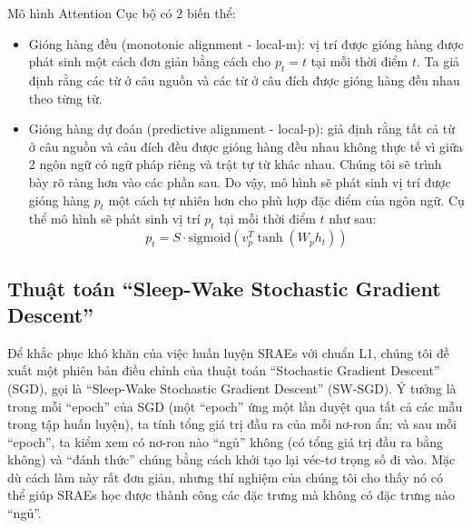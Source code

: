 Mô hình Attention Cục bộ có 2 biến thể:
\begin{itemize}
	\item Gióng hàng đều (monotonic alignment - local-m): vị trí được gióng hàng được phát sinh một cách đơn giản bằng cách cho $p_t = t$ tại mỗi thời điểm $t$. Ta giả định rằng các từ ở câu nguồn và các từ ở câu đích được gióng hàng đều nhau theo từng từ.
	\item Gióng hàng dự đoán (predictive alignment - local-p): giả định rằng tất cả từ ở câu nguồn và câu đích đều được gióng hàng đều nhau không thực tế vì giữa 2 ngôn ngữ có ngữ pháp riêng và trật tự từ khác nhau. Chúng tôi sẽ trình bày rõ ràng hơn vào các phần sau. Do vậy, mô hình sẽ phát sinh vị trí được gióng hàng $p_t$ một cách tự nhiên hơn cho phù hợp đặc điểm của ngôn ngữ. Cụ thể mô hình sẽ phát sinh vị trí $p_t$ tại mỗi thời điểm $t$ như sau:
	\begin{equation}
	p_t = S \cdot \text{sigmoid} (v^T_p \tanh(W_ph_t))
	\end{equation}
\end{itemize}

\subsection{Thuật toán ``Sleep-Wake Stochastic Gradient Descent''}
Để khắc phục khó khăn của việc huấn luyện SRAEs với chuẩn L1, chúng tôi đề xuất một phiên bản điều chỉnh của thuật toán ``Stochastic Gradient Descent'' (SGD), gọi là ``Sleep-Wake Stochastic Gradient Descent'' (SW-SGD). Ý tưởng là trong mỗi ``epoch'' của SGD (một ``epoch'' ứng một lần duyệt qua tất cả các mẫu trong tập huấn luyện), ta tính tổng giá trị đầu ra của mỗi nơ-ron ẩn; và sau mỗi ``epoch'', ta kiểm xem có nơ-ron nào ``ngủ'' không (có tổng giá trị đầu ra bằng không) và ``đánh thức'' chúng bằng cách khởi tạo lại véc-tơ trọng số đi vào. Mặc dù cách làm này rất đơn giản, nhưng thí nghiệm của chúng tôi cho thấy nó có thể giúp SRAEs học được thành công các đặc trưng mà không có đặc trưng nào ``ngủ''.

